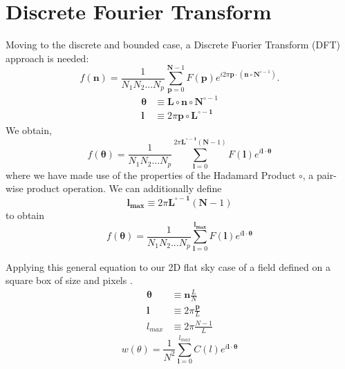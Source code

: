 \section{Discrete Fourier Transform}
Moving to the discrete and bounded case, a Discrete Fuorier Transform (DFT) approach is needed:
\begin{equation}
    f(\bm{n}) = \frac{1}{N_1N_2...N_p}\sum_{\bm{p}=0}^{\bm{N}-1} F(\bm{p}) e^{i2\pi\bm{p}\cdot \left( \bm{n}\circ \bm{N}^{\circ -1}\right)}.
\end{equation}
\begin{align}
    \bm{\theta} &\equiv \bm{L}\circ \bm{n}\circ \bm{N}^{\circ -1}\\
    \bm{l} &\equiv 2\pi\bm{p}\circ\bm{L^{\circ-1}}
\end{align}
We obtain,
\begin{equation}
    f(\bm{\bm{\theta}}) = \frac{1}{N_1N_2...N_p}\sum_{\bm{l}=0}^{2\pi\bm{L^{\circ-1}}(\bm{N}-1)} F(\bm{l}) e^{i\bm{l}\cdot\bm{\theta}}
\end{equation}
where we have made use of the properties of the Hadamard Product $\circ$, a pair-wise product operation. We can additionally define
\begin{equation}
    \bm{l_{max}} \equiv 2\pi\bm{L^{\circ-1}}(\bm{N}-1) 
\end{equation}
to obtain
\begin{equation}
    f(\bm{\bm{\theta}}) = \frac{1}{N_1N_2...N_p}\sum_{\bm{l}=0}^{\bm{l_{max}}} F(\bm{l}) e^{i\bm{l}\cdot\bm{\theta}}
\end{equation}

Applying this general equation to our 2D flat sky case of a field defined on a square box of size  and pixels .
\begin{align}
    \bm{\theta} &\equiv \bm{n}\frac{L}{N}\\
    \bm{l} &\equiv 2\pi\frac{\bm{p}}{L}\\
    l_{max} &\equiv 2\pi\frac{N-1}{L}
\end{align}
\begin{equation}
    w(\theta)=\frac{1}{N^2}\sum_{\bm{l}=0}^{l_{max}} C(l) e^{i\bm{l}\cdot\bm{\theta}}
    \label{eq:DFTcl}
\end{equation}